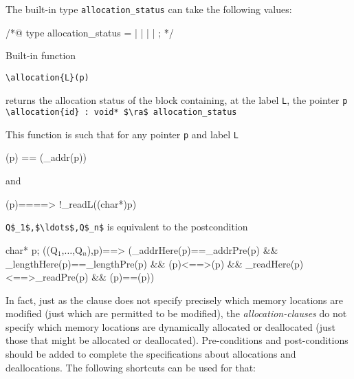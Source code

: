The built-in type \lstinline|allocation_status|
can take the following values:
\begin{notimplementedenv}
\begin{listing-nonumber}
/*@
type allocation_status = 
    \static | \register | \automatic | \dynamic | \unallocated;
*/
\end{listing-nonumber}
\end{notimplementedenv}

Built-in function
\begin{notimplementedenv}\lstinline|\allocation{L}(p)|\end{notimplementedenv}%
returns the allocation status of the block containing, at the label 
\lstinline|L|, the pointer \lstinline|p| 
\\ \makebox[5mm]{} \lstinline|\allocation{id} : void* $\ra$ allocation_status|

This function is such that for any pointer \lstinline|p| and label \lstinline|L|
\begin{listing-nonumber}
(p) == (\base_addr(p))
\end{listing-nonumber}
and
\begin{listing-nonumber}
(p)==\unallocated ==> !\valid_read{L}((char*)p)
\end{listing-nonumber}

\allocates \lstinline|Q$_1$,$\ldots$,Q$_n$| is equivalent to the postcondition
\begin{listing-nonumber}
\forall char* p; 
\separated(\union(Q$_1$,$\ldots$,Q$_n$),p)==>
     (\base_addr{Here}(p)==\base_addr{Pre}(p)
      && \block_length{Here}(p)==\block_length{Pre}(p)
      && (p)<==>(p)
      && \valid_read{Here}(p)<==>\valid_read{Pre}(p)
      && (p)==(p))
\end{listing-nonumber}

In fact, just as the \assigns clause does not specify precisely which memory locations are
modified (just which are permitted to be modified),
the \textsl{allocation-clauses} do not specify which memory locations 
are dynamically allocated or deallocated (just those that might be allocated or deallocated).
Pre-conditions and post-conditions should be added to complete the specifications
about allocations and deallocations.
The following shortcuts can be used for that:

